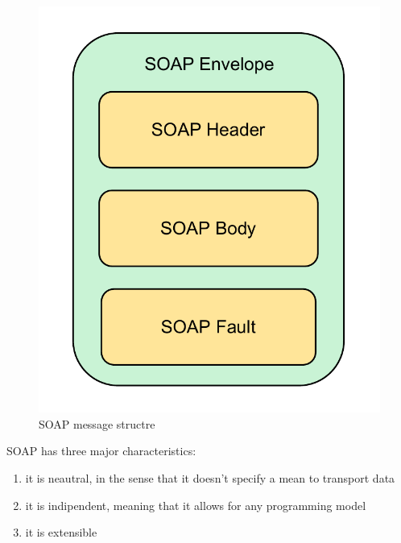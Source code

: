 \begin{figure}[h]
\begin{center}
\includegraphics[scale=0.50]{../Figures/SOAP.pdf}
\end{center}
\caption{SOAP message structre}
\label{figure:soap-message}
\end{figure}



SOAP has three major characteristics:
\begin{enumerate}[1.]
\item it is neautral, in the sense that it doesn't specify a mean to transport data
\item it is indipendent, meaning that it allows for any programming model
\item it is extensible
\end{enumerate}

